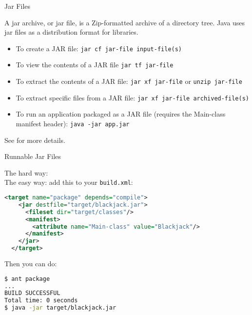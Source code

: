 \documentclass{beamer}
\begin{document}
\begin{frame}[fragile]{Jar Files}

A jar archive, or jar file, is a Zip-formatted archive of a directory tree.
Java uses jar files as a distribution format for libraries.

\begin{itemize}
\item To create a JAR file: {\tt jar cf jar-file input-file(s)}
\item To view the contents of a JAR file {\tt jar tf jar-file}
\item To extract the contents of a JAR file: {\tt jar xf jar-file} or {\tt unzip jar-file}
\item To extract specific files from a JAR file: {\tt jar xf jar-file archived-file(s)}
\item To run an application packaged as a JAR file (requires the Main-class manifest header): {\tt java -jar app.jar}
\end{itemize}

See
 for more details.

\end{frame}

\begin{frame}[fragile]{Runnable Jar Files}


The hard way: \\
\vspace{.1in}
The easy way: add this to your {\tt build.xml}:
\begin{lstlisting}[language=xml]
  <target name="package" depends="compile">
    <jar destfile="target/blackjack.jar">
      <fileset dir="target/classes"/>
      <manifest>
        <attribute name="Main-class" value="Blackjack"/>
      </manifest>
    </jar>
  </target>
\end{lstlisting}

Then you can do:

\begin{lstlisting}[language=bash]
$ ant package
...
BUILD SUCCESSFUL
Total time: 0 seconds
$ java -jar target/blackjack.jar
\end{lstlisting}



\end{frame}
\end{document}
